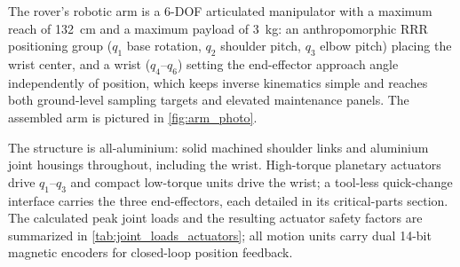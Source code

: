 %
%


The rover's robotic arm is a 6-DOF articulated manipulator with a maximum
reach of \qty{132}{\centi\meter} and a maximum payload of
\qty{3}{\kilo\gram}: an anthropomorphic RRR positioning group ($q_1$ base
rotation, $q_2$ shoulder pitch, $q_3$ elbow pitch) placing the wrist
center, and a wrist ($q_4$--$q_6$) setting the end-effector
approach angle independently of position, which keeps inverse kinematics
simple and reaches both ground-level sampling targets and elevated
maintenance panels. The assembled arm is pictured in
\autoref{fig:arm_photo}.

The structure is all-aluminium: solid machined shoulder links and
aluminium joint housings throughout, including the wrist. High-torque
planetary actuators drive $q_1$--$q_3$ and compact low-torque units drive
the wrist; a tool-less quick-change interface carries the three
end-effectors, each detailed in its critical-parts section. The
calculated peak joint loads and the resulting actuator safety factors are
summarized in \autoref{tab:joint_loads_actuators}; all motion units carry
dual 14-bit magnetic encoders for closed-loop position feedback.

